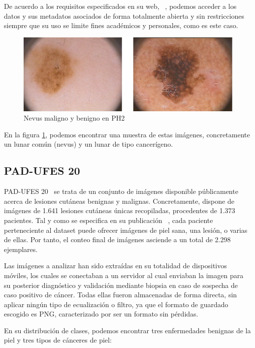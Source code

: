 De acuerdo a los requisitos especificados en su web, ~\cite{ph2data}, podemos acceder a los datos  y sus metadatos asociados de forma totalmente abierta y sin restricciones siempre que su uso se limite fines académicos y personales, como es este caso.
\begin{figure}[H]
	\centering
	\includegraphics[scale = 0.6]{imagenes/PH2.png}
	\caption{Nevus maligno y benigno en PH2}
	\label {ph2}
\end{figure}

En la figura \ref{ph2}, podemos encontrar una muestra de estas imágenes, concretamente un lunar común (nevus) y un lunar de tipo cancerígeno.

\subsection{PAD-UFES 20}
\label{padufesdesc}
PAD-UFES 20~\cite{PACHECO2020106221} se trata de un conjunto de imágenes disponible públicamente acerca de lesiones cutáneas benignas y malignas. Concretamente, dispone de imágenes de 1.641 lesiones cutáneas únicas recopiladas, procedentes de 1.373 pacientes. Tal y como se especifica en su publicación ~\cite{PACHECO2020106221}, cada paciente perteneciente al dataset puede ofrecer imágenes de piel sana, una lesión, o varias de ellas. Por tanto, el conteo final de imágenes asciende a un total de 2.298 ejemplares.

Las imágenes a analizar han sido extraídas en su totalidad de dispositivos móviles, los cuales se conectaban a un servidor al cual enviaban la imagen para su posterior diagnóstico y validación mediante biopsia en caso de sospecha de caso positivo de cáncer. Todas ellas fueron almacenadas de forma directa, sin aplicar ningún tipo de ecualización o filtro, ya que el formato de guardado escogido es PNG, caracterizado por ser un formato sin pérdidas.

En su distribución de clases, podemos encontrar tres enfermedades benignas de la piel y tres tipos de cánceres de piel:

